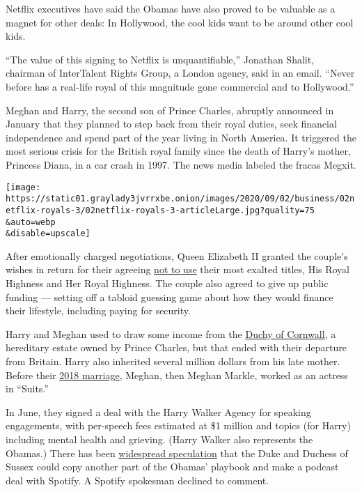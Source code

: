 Netflix executives have said the Obamas have also proved to be valuable
as a magnet for other deals: In Hollywood, the cool kids want to be
around other cool kids.

``The value of this signing to Netflix is unquantifiable,'' Jonathan
Shalit, chairman of InterTalent Rights Group, a London agency, said in
an email. ``Never before has a real-life royal of this magnitude gone
commercial and to Hollywood.''

Meghan and Harry, the second son of Prince Charles, abruptly announced
in January that they planned to step back from their royal duties, seek
financial independence and spend part of the year living in North
America. It triggered the most serious crisis for the British royal
family since the death of Harry's mother, Princess Diana, in a car crash
in 1997. The news media labeled the fracas Megxit.

\texttt{[image: https://static01.graylady3jvrrxbe.onion/images/2020/09/02/business/02netflix-royals-3/02netflix-royals-3-articleLarge.jpg?quality=75\\\&auto=webp\\\&disable=upscale]}

After emotionally charged negotiations, Queen Elizabeth II granted the
couple's wishes in return for their agreeing
\href{https://www.nytimes3xbfgragh.onion/2020/02/21/world/europe/harry-meghan-sussexroyal.html}{not
to use} their most exalted titles, His Royal Highness and Her Royal
Highness. The couple also agreed to give up public funding --- setting
off a tabloid guessing game about how they would finance their
lifestyle, including paying for security.

Harry and Meghan used to draw some income from the
\href{https://www.nytimes3xbfgragh.onion/2020/01/26/world/europe/harry-meghan-charles-duchy-of-cornwall.html}{Duchy
of Cornwall}, a hereditary estate owned by Prince Charles, but that
ended with their departure from Britain. Harry also inherited several
million dollars from his late mother. Before their
\href{https://www.nytimes3xbfgragh.onion/interactive/2018/04/06/style/meghan-markle-prince-harry-royal-wedding.html}{2018
marriage}, Meghan, then Meghan Markle, worked as an actress in
``Suits.''

In June, they signed a deal with the Harry Walker Agency for speaking
engagements, with per-speech fees estimated at \$1 million and topics
(for Harry) including mental health and grieving. (Harry Walker also
represents the Obamas.) There has been
\href{https://www.dailymail.co.uk/femail/article-8678495/Meghan-Markle-Prince-Harry-set-offered-Spotify-megadeal-exclusive-podcasts.html}{widespread
speculation} that the Duke and Duchess of Sussex could copy another part
of the Obamas' playbook and make a podcast deal with Spotify. A Spotify
spokesman declined to comment.

